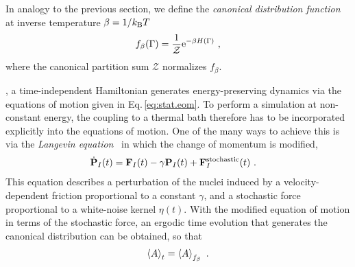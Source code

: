 In analogy to the previous section, we define the \emph{canonical distribution function} at inverse temperature $\beta = 1 / k_{\rm B} T$
\begin{align}
	f_\beta (\Gamma) 
		= \frac{1}{\mathcal{Z}} {\rm e}^{- \beta H (\Gamma)}~,
	\label{eq:f.canonical}
\end{align}
where the  canonical partition sum $\mathcal{Z}$ normalizes $f_\beta$. 

, a time-independent Hamiltonian generates energy-preserving dynamics via the equations of motion given in Eq.\,\eqref{eq:stat.eom}. To perform a simulation at non-constant energy, the coupling to a thermal bath therefore has to be incorporated explicitly into the equations of motion. One of the many ways to achieve this is via the \emph{Langevin equation}~\cite{Vanden2006} in which the change of momentum is modified,
\begin{align}
	\dot{\b P}_I (t) 
		&= \b F_I (t) - \gamma \b P_I (t) + \b F^{\rm stochastic}_I (t)~.
	\label{eq:stat.Langevin}
\end{align}
This equation describes a perturbation of the nuclei induced by a velocity-dependent friction proportional to a constant $\gamma$,%
and a stochastic force proportional to a white-noise kernel $\eta (t)$. With the modified equation of motion in terms of the stochastic force, an ergodic time evolution that generates the canonical distribution can be obtained, so that
\begin{align}
  \braket{A}_t = \braket{A}_{f_\beta}~.
\end{align}

